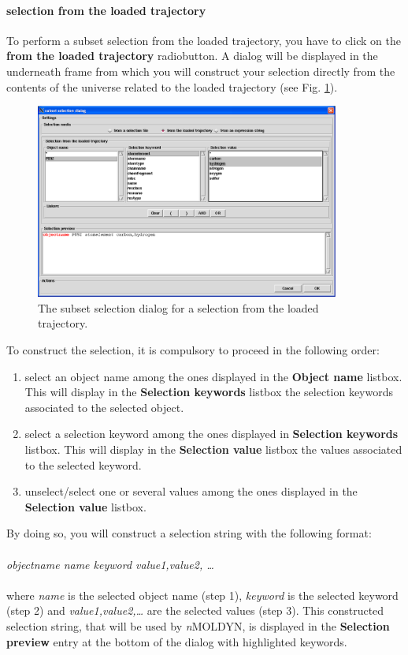 \documentclass[a4paper,11pt]{report}
\newcommand{\NMOLDYN}{\textit{n}MOLDYN}
\begin{document}
\paragraph{selection from the loaded trajectory\\}
To perform a subset selection from the loaded trajectory, you have to click on the \textbf{from the loaded trajectory} radiobutton.
A dialog will be displayed in the underneath frame from which you will construct your selection directly from the contents of the 
universe related to the loaded trajectory (see Fig. \ref{fig:subset_selection_from_the_loaded_trajectory}).
\begin{figure}[h!]
\begin{center}
\includegraphics[width=10cm]{Figures/subset_selection_from_the_loaded_trajectory.eps}
\end{center}
\caption[The subset selection dialog for a selection from the loaded trajectory]{The subset selection dialog for a selection from the loaded trajectory.}
\label{fig:subset_selection_from_the_loaded_trajectory}
\end{figure}   

To construct the selection, it is compulsory to proceed in the following order:
\begin{enumerate}
\item select an object name among the ones displayed in the \textbf{Object name} listbox. This will 
display in the \textbf{Selection keywords} listbox the selection keywords associated to the selected object.
\item select a selection keyword among the ones displayed in \textbf{Selection keywords} listbox. This will display in the 
\textbf{Selection value} listbox the values associated to the selected keyword.
\item unselect/select one or several values among the ones displayed in the \textbf{Selection value} listbox.
\end{enumerate}
By doing so, you will construct a selection string with the following format:
\\\\
\textit{objectname name keyword value1,value2, \ldots}
\\\\
where \textit{name} is the selected object name (step 1), \textit{keyword} is the selected keyword (step 2) and 
\textit{value1,value2,\ldots} are the selected values (step 3). This constructed selection string, that will be used by 
\NMOLDYN , is displayed in the \textbf{Selection preview} entry at the bottom of the dialog with highlighted keywords. 
\end{document}

